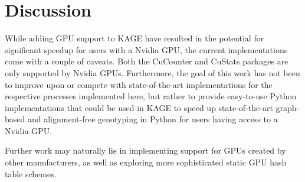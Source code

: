 \section*{Discussion}
While adding GPU support to KAGE have resulted in the potential for significant speedup for users with a Nvidia GPU, the current implementations come with a couple of caveats.
Both the CuCounter and CuStats packages are only supported by Nvidia GPUs.
Furthermore, the goal of this work has not been to improve upon or compete with state-of-the-art implementations for the respective processes implemented here, but rather to provide easy-to-use Python implementations that could be used in KAGE to speed up state-of-the-art graph-based and alignment-free genotyping in Python for users having access to a Nvidia GPU.

Further work may naturally lie in implementing support for GPUs created by other manufacturers, as well as exploring more sophisticated static GPU hash table schemes.

